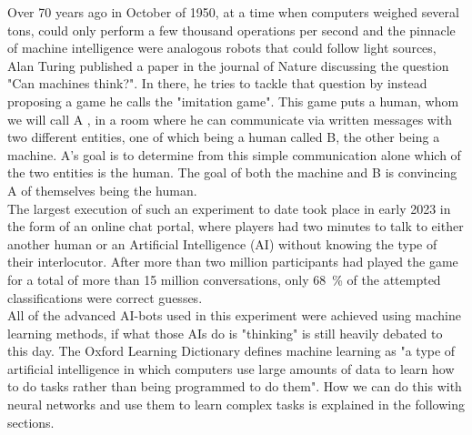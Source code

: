 Over 70 years ago in October of 1950, at a time when computers weighed several tons, could only perform a few thousand operations per second and the pinnacle of machine intelligence were analogous robots that could follow light sources\cite{FirstThinkingMachinesArticle}, Alan Turing published a paper in the journal of Nature discussing the question "Can machines think?"\cite{TuringThinkingPaper}. In there, he tries to tackle that question by instead proposing a game he calls the "imitation game". This game puts a human, whom we will call A , in a room where he can communicate via written messages with two different entities, one of which being a human called B, the other being a machine. A's goal is to determine from this simple communication alone which of the two entities is the human. The goal of both the machine and B is convincing A of themselves being the human.\\
The largest execution of such an experiment to date took place in early 2023 in the form of an online chat portal, where players had two minutes to talk to either another human or an Artificial Intelligence (AI) without knowing the type of their interlocutor. After more than two million participants had played the game for a total of more than 15 million conversations, only \SI{68}{\percent} of the attempted classifications were correct guesses.\\
All of the advanced AI-bots used in this experiment were achieved using machine learning methods, if what those AIs do is "thinking" is still heavily debated to this day. The Oxford Learning Dictionary defines machine learning as "a type of artificial intelligence in which computers use large amounts of data to learn how to do tasks rather than being programmed to do them"\cite{MLDefinition}. How we can do this with neural networks and use them to learn complex tasks is explained in the following sections.

